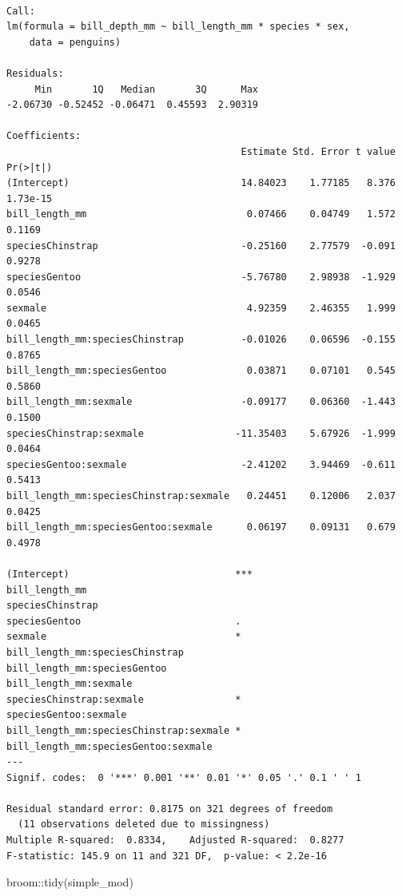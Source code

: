 \documentclass[
  letterpaper,
  DIV=11,
  numbers=noendperiod]{scrartcl}
\newenvironment{Shaded}{\begin{snugshade}}{\end{snugshade}}
\newcommand{\FunctionTok}[1]{\textcolor[rgb]{0.28,0.35,0.67}{#1}}
\newcommand{\NormalTok}[1]{\textcolor[rgb]{0.00,0.23,0.31}{#1}}
\newcommand{\SpecialCharTok}[1]{\textcolor[rgb]{0.37,0.37,0.37}{#1}}
\begin{document}
\begin{verbatim}

Call:
lm(formula = bill_depth_mm ~ bill_length_mm * species * sex, 
    data = penguins)

Residuals:
     Min       1Q   Median       3Q      Max 
-2.06730 -0.52452 -0.06471  0.45593  2.90319 

Coefficients:
                                         Estimate Std. Error t value Pr(>|t|)
(Intercept)                              14.84023    1.77185   8.376 1.73e-15
bill_length_mm                            0.07466    0.04749   1.572   0.1169
speciesChinstrap                         -0.25160    2.77579  -0.091   0.9278
speciesGentoo                            -5.76780    2.98938  -1.929   0.0546
sexmale                                   4.92359    2.46355   1.999   0.0465
bill_length_mm:speciesChinstrap          -0.01026    0.06596  -0.155   0.8765
bill_length_mm:speciesGentoo              0.03871    0.07101   0.545   0.5860
bill_length_mm:sexmale                   -0.09177    0.06360  -1.443   0.1500
speciesChinstrap:sexmale                -11.35403    5.67926  -1.999   0.0464
speciesGentoo:sexmale                    -2.41202    3.94469  -0.611   0.5413
bill_length_mm:speciesChinstrap:sexmale   0.24451    0.12006   2.037   0.0425
bill_length_mm:speciesGentoo:sexmale      0.06197    0.09131   0.679   0.4978
                                           
(Intercept)                             ***
bill_length_mm                             
speciesChinstrap                           
speciesGentoo                           .  
sexmale                                 *  
bill_length_mm:speciesChinstrap            
bill_length_mm:speciesGentoo               
bill_length_mm:sexmale                     
speciesChinstrap:sexmale                *  
speciesGentoo:sexmale                      
bill_length_mm:speciesChinstrap:sexmale *  
bill_length_mm:speciesGentoo:sexmale       
---
Signif. codes:  0 '***' 0.001 '**' 0.01 '*' 0.05 '.' 0.1 ' ' 1

Residual standard error: 0.8175 on 321 degrees of freedom
  (11 observations deleted due to missingness)
Multiple R-squared:  0.8334,    Adjusted R-squared:  0.8277 
F-statistic: 145.9 on 11 and 321 DF,  p-value: < 2.2e-16
\end{verbatim}

\begin{Shaded}
\begin{Highlighting}[]
\NormalTok{broom}\SpecialCharTok{::}\FunctionTok{tidy}\NormalTok{(simple\_mod)}
\end{Highlighting}
\end{Shaded}
\end{document}
